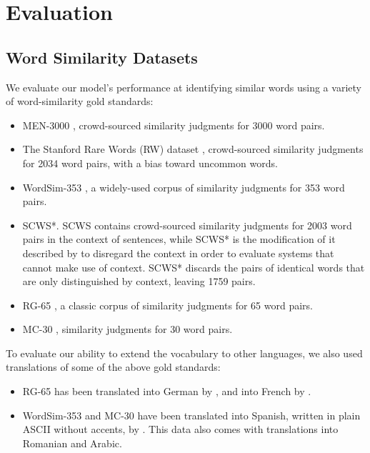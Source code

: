 \documentclass[letterpaper]{article}
\begin{document}
\section{Evaluation}

\subsection{Word Similarity Datasets}

We evaluate our model's performance at identifying similar words using a
variety of word-similarity gold standards:

\begin{itemize}
\item MEN-3000 \cite{bruni2014men}, crowd-sourced similarity judgments for 3000
    word pairs.
\item The Stanford Rare Words (RW) dataset \cite{luong2013rw}, crowd-sourced
    similarity judgments for 2034 word pairs, with a bias toward uncommon words.
\item WordSim-353 \cite{finkelstein2001ws}, a widely-used corpus of similarity
    judgments for 353 word pairs.
\item SCWS*. SCWS \cite{huang2012scws} contains crowd-sourced similarity
    judgments for 2003 word pairs in the context of sentences, while SCWS* is
    the modification of it described by 
    to disregard the context in order to evaluate
    systems that cannot make use of context. SCWS* discards the pairs of
    identical words that are only distinguished by context, leaving 1759 pairs.
\item RG-65 \cite{rubenstein1965rg}, a classic corpus of similarity judgments
    for 65 word pairs.
\item MC-30 \cite{miller1991mc}, similarity judgments for 30 word pairs.
\end{itemize}

To evaluate our ability to extend the vocabulary to other languages, we also
used translations of some of the above gold standards:

\begin{itemize}
\item RG-65 has been translated into German by ,
    and into French by .
\item WordSim-353 and MC-30 have been translated into Spanish, written in
    plain ASCII without accents, by . This
    data also comes with translations into Romanian and Arabic.
\end{itemize}
\end{document}
